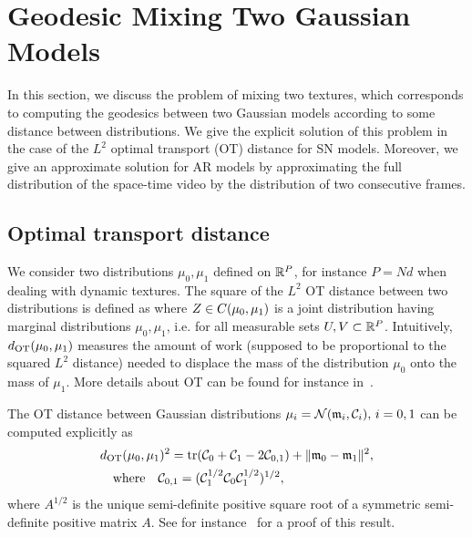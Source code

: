 
\section{Geodesic Mixing Two Gaussian Models}
\label{sec-geodesic}

In this section, we discuss the problem of mixing two textures, which corresponds to computing the geodesics between two Gaussian models according to some distance between distributions. We give the explicit solution of this problem in the case of the $L^2$ optimal transport (OT) distance for SN models. Moreover, we give an approximate solution for AR models by approximating the full distribution of the space-time video by the distribution of two consecutive frames.


\subsection{Optimal transport distance}

We consider two distributions $\mu_0,\mu_1$ defined on $\mathbb{R}^P$, for instance $P=Nd$ when dealing with dynamic textures. The square of the $L^2$ OT distance between two distributions is defined as
where $Z \in C( \mu_0,\mu_1 )$ is a joint distribution having marginal distributions $\mu_0,\mu_1$, i.e.
for all measurable sets $U,V \subset \mathbb{R}^P$. Intuitively, $d_{\text{OT}}(\mu_0,\mu_1)$ measures the amount of work (supposed to be proportional to the squared $L^2$ distance) needed to displace the mass of the distribution $\mu_0$ onto the mass of $\mu_1$. More details about OT can be found for instance in~\cite{villani-topics}.

The OT distance between Gaussian distributions $\mu_i = \mathcal{N}({\frak m}_i,\mathcal{C}_i), \, i=0, 1$ can be computed explicitly as
\begin{align}
\label{eq-OT-dist}
	&\dist{OT}(\distr_0,\distr_1)^2 = \tr(\Cov_0 + \Cov_1 - 2 \Cov_{0,1}) + \norm{\Mean_0-\Mean_1}^2, \\
\label{eq-c01}
 &\qwhereq   \Cov_{0,1} =  ( \Cov_1^{1/2} \Cov_0 \Cov_1^{1/2} )^{1/2},
\end{align}
where $A^{1/2}$ is the unique semi-definite positive square root of a symmetric semi-definite positive matrix $A$. See for instance~\cite{gowson-transport-gaussian} for a proof of this result.

